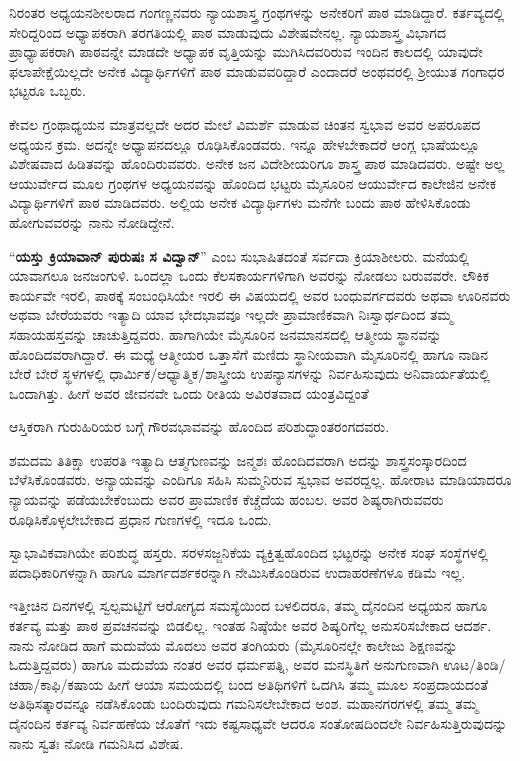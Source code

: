 {ನಿರಂತರ ಅಧ್ಯಯನಶೀಲರಾದ ಗಂಗಣ್ಣನವರು ನ್ಯಾಯಶಾಸ್ತ್ರ ಗ್ರಂಥಗಳನ್ನು ಅನೇಕರಿಗೆ ಪಾಠ ಮಾಡಿದ್ದಾರೆ. ಕರ್ತವ್ಯದಲ್ಲಿ ಸೇರಿದ್ದರಿಂದ ಅಧ್ಯಾಪಕರಾಗಿ ತರಗತಿಯಲ್ಲಿ ಪಾಠ ಮಾಡುವುದು ವಿಶೇಷವೇನಲ್ಲ. ನ್ಯಾಯಶಾಸ್ತ್ರ ವಿಭಾಗದ ಪ್ರಾಧ್ಯಾಪಕರಾಗಿ ಪಾಠವನ್ನೇ ಮಾಡದೇ ಅಧ್ಯಾಪಕ ವೃತ್ತಿಯನ್ನು ಮುಗಿಸಿದವರಿರುವ ಇಂದಿನ ಕಾಲದಲ್ಲಿ ಯಾವುದೇ ಫಲಾಪೇಕ್ಷೆಯಿಲ್ಲದೇ ಅನೇಕ ವಿದ್ಯಾರ್ಥಿಗಳಿಗೆ ಪಾಠ ಮಾಡುವವರಿದ್ದಾರೆ ಎಂದಾದರೆ ಅಂಥವರಲ್ಲಿ ಶ್ರೀಯುತ ಗಂಗಾಧರ ಭಟ್ಟರೂ ಒಬ್ಬರು.

ಕೇವಲ ಗ್ರಂಥಾಧ್ಯಯನ ಮಾತ್ರವಲ್ಲದೇ ಅದರ ಮೇಲೆ ವಿಮರ್ಶೆ ಮಾಡುವ ಚಿಂತನ ಸ್ವಭಾವ ಅವರ ಅಪರೂಪದ ಅಧ್ಯಯನ ಕ್ರಮ. ಅದನ್ನೇ ಅಧ್ಯಾಪನದಲ್ಲೂ ರೂಢಿಸಿಕೊಂಡವರು. ಇನ್ನೂ ಹೇಳಬೇಕಾದರೆ ಆಂಗ್ಲ ಭಾಷೆಯಲ್ಲೂ ವಿಶೇಷವಾದ ಹಿಡಿತ\-ವನ್ನು ಹೊಂದಿರುವವರು. ಅನೇಕ ಜನ ವಿದೇಶೀಯರಿಗೂ ಶಾಸ್ತ್ರ ಪಾಠ ಮಾಡಿದವರು. ಅಷ್ಟೇ ಅಲ್ಲ ಆಯುರ್ವೇದ ಮೂಲ ಗ್ರಂಥಗಳ ಅಧ್ಯಯನವನ್ನು ಹೊಂದಿದ ಭಟ್ಟರು ಮೈಸೂರಿನ ಆಯುರ್ವೇದ ಕಾಲೇಜಿನ ಅನೇಕ ವಿದ್ಯಾರ್ಥಿಗಳಿಗೆ ಪಾಠ ಮಾಡಿದವರು. ಅಲ್ಲಿಯ ಅನೇಕ ವಿದ್ಯಾರ್ಥಿಗಳು ಮನೆಗೇ ಬಂದು ಪಾಠ ಹೇಳಿಸಿಕೊಂಡು ಹೋಗುವವರನ್ನು ನಾನು ನೋಡಿದ್ದೇನೆ.

“\textbf{ಯಸ್ತು ಕ್ರಿಯಾವಾನ್ ಪುರುಷಃ ಸ ವಿದ್ವಾನ್}” ಎಂಬ ಸುಭಾಷಿತದಂತೆ ಸರ್ವದಾ ಕ್ರಿಯಾಶೀಲರು. ಮನೆಯಲ್ಲಿ ಯಾವಾಗಲೂ ಜನಜಂಗುಳಿ. ಒಂದಲ್ಲಾ ಒಂದು ಕೆಲಸ\enginline{-}ಕಾರ್ಯಗಳಿಗಾಗಿ ಅವರನ್ನು ನೋಡಲು ಬರುವವರೇ. ಲೌಕಿಕ ಕಾರ್ಯವೇ ಇರಲಿ, ಪಾಠಕ್ಕೆ ಸಂಬಂಧಿಸಿಯೇ ಇರಲಿ ಈ ವಿಷಯದಲ್ಲಿ ಅವರ ಬಂಧುವರ್ಗದವರು ಅಥವಾ ಊರಿನವರು ಅಥವಾ ಬೇರೆಯವರು ಇತ್ಯಾದಿ ಯಾವ ಭೇದ\enginline{-}ಭಾವವೂ ಇಲ್ಲದೇ ಪ್ರಾಮಾಣಿಕವಾಗಿ ನಿಃಸ್ವಾರ್ಥದಿಂದ ತಮ್ಮ ಸಹಾಯಹಸ್ತವನ್ನು ಚಾಚುತ್ತಿದ್ದವರು. ಹಾಗಾಗಿಯೇ ಮೈಸೂರಿನ ಜನಮಾನಸದಲ್ಲಿ ಆತ್ಮೀಯ ಸ್ಥಾನವನ್ನು ಹೊಂದಿದವರಾಗಿದ್ದಾರೆ. ಈ ಮಧ್ಯೆ ಆತ್ಮೀಯರ ಒತ್ತಾಸೆಗೆ ಮಣಿದು ಸ್ಥಾನೀಯವಾಗಿ ಮೈಸೂರಿನಲ್ಲಿ ಹಾಗೂ ನಾಡಿನ ಬೇರೆ ಬೇರೆ ಸ್ಥಳಗಳಲ್ಲಿ ಧಾರ್ಮಿಕ/ಆಧ್ಯಾತ್ಮಿಕ/ಶಾಸ್ತ್ರೀಯ ಉಪನ್ಯಾಸಗಳನ್ನು ನಿರ್ವಹಿಸುವುದು ಅನಿವಾರ್ಯತೆಯಲ್ಲಿ ಒಂದಾಗಿತ್ತು. ಹೀಗೆ ಅವರ ಜೀವನವೇ ಒಂದು ರೀತಿಯ ಅವಿರತವಾದ ಯಂತ್ರವಿದ್ದಂತೆ
\vskip 2pt

ಆಸ್ತಿಕರಾಗಿ ಗುರು\enginline{-}ಹಿರಿಯರ ಬಗ್ಗೆ ಗೌರವಭಾವವನ್ನು ಹೊಂದಿದ ಪರಿಶುದ್ಧಾಂತ\-ರಂಗದವರು. 
\vskip 2pt

ಶಮ\enginline{-}ದಮ  \enginline{-}  ತಿತಿಕ್ಷಾ  \enginline{-}  ಉಪರತಿ ಇತ್ಯಾದಿ ಆತ್ಮಗುಣವನ್ನು ಜನ್ಮಶಃ ಹೊಂದಿದವ\-ರಾಗಿ ಅದನ್ನು ಶಾಸ್ತ್ರಸಂಸ್ಕಾರದಿಂದ ಬೆಳೆಸಿಕೊಂಡವರು. ಅನ್ಯಾಯವನ್ನು ಎಂದಿಗೂ ಸಹಿಸಿ ಸುಮ್ಮನಿರುವ ಸ್ವಭಾವ ಅವರದ್ದಲ್ಲ. ಹೋರಾಟ ಮಾಡಿಯಾದರೂ ನ್ಯಾಯವನ್ನು ಪಡೆಯ\-ಬೇಕೆಂಬುದು ಅವರ ಪ್ರಾಮಾಣಿಕ ಕೆಚ್ಚೆದೆಯ ಹಂಬಲ. ಅವರ ಶಿಷ್ಯರಾಗಿರು\-ವವರು ರೂಢಿಸಿಕೊಳ್ಳಲೇಬೇಕಾದ ಪ್ರಧಾನ ಗುಣಗಳಲ್ಲಿ ಇದೂ ಒಂದು.
\vskip 2pt

ಸ್ವಾಭಾವಿಕವಾಗಿಯೇ ಪರಿಶುದ್ಧ ಹಸ್ತರು. ಸರಳಸಜ್ಜನಿಕೆಯ ವ್ಯಕ್ತಿತ್ವಹೊಂದಿದ ಭಟ್ಟರನ್ನು ಅನೇಕ ಸಂಘ ಸಂಸ್ಥೆಗಳಲ್ಲಿ ಪದಾಧಿಕಾರಿಗಳನ್ನಾಗಿ ಹಾಗೂ ಮಾರ್ಗದರ್ಶಕರನ್ನಾಗಿ ನೇಮಿಸಿಕೊಂಡಿರುವ ಉದಾಹರಣೆಗಳೂ ಕಡಿಮೆ ಇಲ್ಲ.
\vskip 2pt

ಇತ್ತೀಚಿನ ದಿನಗಳಲ್ಲಿ ಸ್ವಲ್ಪಮಟ್ಟಿಗೆ ಆರೋಗ್ಯದ ಸಮಸ್ಯೆಯಿಂದ ಬಳಲಿದರೂ, ತಮ್ಮ ದೈನಂದಿನ ಅಧ್ಯಯನ ಹಾಗೂ ಕರ್ತವ್ಯ ಮತ್ತು ಪಾಠ ಪ್ರವಚನವನ್ನು ಬಿಡಲಿಲ್ಲ. ಇಂತಹ ನಿಷ್ಠೆಯೇ ಅವರ ಶಿಷ್ಯರಿಗೆಲ್ಲ ಅನುಸರಿಸಬೇಕಾದ ಆದರ್ಶ. ನಾನು ನೋಡಿದ ಹಾಗೆ ಮದುವೆಯ ಮೊದಲು ಅವರ ತಂಗಿಯರು (ಮೈಸೂರಿನಲ್ಲೇ ಕಾಲೇಜು ಶಿಕ್ಷಣ\-ವನ್ನು ಓದುತ್ತಿದ್ದವರು) ಹಾಗೂ ಮದುವೆಯ ನಂತರ ಅವರ ಧರ್ಮಪತ್ನಿ, ಅವರ ಮನಸ್ಥಿತಿಗೆ ಅನುಗುಣವಾಗಿ ಊಟ/ತಿಂಡಿ/ಚಹಾ/ಕಾಫಿ/ಕಷಾಯ ಹೀಗೆ ಆಯಾ ಸಮಯದಲ್ಲಿ ಬಂದ ಅತಿಥಿಗಳಿಗೆ ಒದಗಿಸಿ ತಮ್ಮ ಮೂಲ ಸಂಪ್ರದಾಯದಂತೆ ಅತಿಥಿಸತ್ಕಾರವನ್ನೂ ನಡೆಸಿಕೊಂಡು ಬಂದಿರುವುದು ಗಮನಿಸಲೇಬೇಕಾದ ಅಂಶ. ಮಹಾನಗರಗಳಲ್ಲಿ ತಮ್ಮ ತಮ್ಮ ದೈನಂದಿನ ಕರ್ತವ್ಯ ನಿರ್ವಹಣೆಯ ಜೊತೆಗೆ ಇದು ಕಷ್ಟಸಾಧ್ಯವೇ ಆದರೂ ಸಂತೋಷದಿಂದಲೇ ನಿರ್ವಹಿಸುತ್ತಿರುವುದನ್ನು ನಾನು ಸ್ವತಃ ನೋಡಿ ಗಮನಿಸಿದ ವಿಶೇಷ.

}
